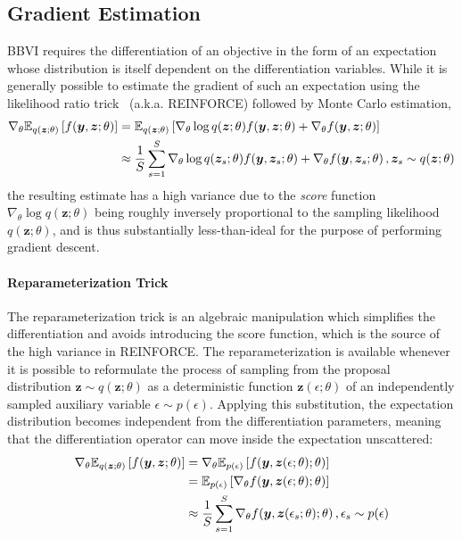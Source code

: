 \documentclass[11pt]{article}
\begin{document}
\subsection{Gradient Estimation}

BBVI requires the differentiation of an objective in the form of an expectation
whose distribution is itself dependent on the differentiation variables.  While
it is generally possible to estimate the gradient of such an expectation using
the likelihood ratio trick~\cite{williams_simple_1992} (a.k.a. REINFORCE)
followed by Monte Carlo estimation,
%
\begin{align}
  \nabla_\theta {\mathbb{E}}_{q(\bm z;\theta)}\left[ f(\bm y, \bm z; \theta) \right] &=
  {\mathbb{E}}_{q(\bm z;\theta)}\left[ \nabla_\theta \log q(\bm z;\theta) f(\bm y, \bm
  z; \theta) + \nabla_\theta f(\bm y, \bm z; \theta) \right] \nonumber \\
  &\approx \frac{1}{S} \sum_{s=1}^S \nabla_\theta \log q(\bm z_s; \theta) f(\bm
  y, \bm z_s; \theta) + \nabla_\theta f(\bm y, \bm z_s; \theta) \,, \bm z_s
  \sim q(\bm z; \theta)
\end{align}
%
\noindent the resulting estimate has a high variance due to the \emph{score}
function $\nabla_\theta \log q(\bm z; \theta)$ being roughly inversely
proportional to the sampling likelihood $q(\bm z; \theta)$, and is thus
substantially less-than-ideal for the purpose of performing gradient descent.

\paragraph{Reparameterization Trick}

The reparameterization trick is an algebraic manipulation which simplifies the
differentiation and avoids introducing the score function, which is the source
of the high variance in REINFORCE.  The reparameterization is available
whenever it is possible to reformulate the process of sampling from the
proposal distribution $\bm z\sim q(\bm z; \theta)$ as a deterministic function
$\bm z(\epsilon; \theta)$ of an independently sampled auxiliary variable
$\epsilon\sim p(\epsilon)$.  Applying this substitution, the expectation
distribution becomes independent from the differentiation parameters, meaning
that the differentiation operator can move inside the expectation unscattered:
%
\begin{align}
  \nabla_\theta {\mathbb{E}}_{q(\bm z; \theta)}\left[ f(\bm y, \bm z; \theta) \right] &=
  \nabla_\theta {\mathbb{E}}_{p(\epsilon)}\left[ f(\bm y, \bm z(\epsilon; \theta); \theta) \right] \nonumber \\
  &= {\mathbb{E}}_{p(\epsilon)}\left[ \nabla_\theta f(\bm y, \bm z(\epsilon; \theta); \theta) \right] \nonumber \\
  &\approx \frac{1}{S} \sum_{s=1}^S \nabla_\theta f(\bm y, \bm z(\epsilon_s; \theta); \theta)\,, \epsilon_s \sim p(\epsilon)
\end{align}
\end{document}
